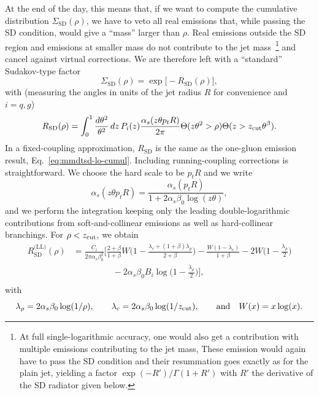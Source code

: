 At the end of the day, this means that, if we want to compute the
cumulative distribution $\Sigma_{\text{SD}}(\rho)$, we have to
veto all real emissions that, while passing the SD condition, would give a ``mass'' larger than $\rho$.
Real emissions outside the SD
region and emissions at smaller mass do not contribute to the jet
mass~\footnote{At full single-logarithmic accuracy, one would also get
  a contribution with multiple emissions contributing to the jet mass,
  These emission would again have to pass the SD condition and
  their resummation goes exactly as for the plain jet, yielding a
  factor $\exp(-R')/\Gamma(1+R')$ with $R'$ the derivative of the
  SD radiator given below.} and cancel against virtual
corrections. We are therefore left with a ``standard'' Sudakov-type
factor
\begin{equation}\label{eq:mMDTSD-ll}
 \Sigma_{\text{SD}}(\rho) = \exp\big[-R_{\text{SD}}(\rho)\big],
\end{equation}
with (measuring the angles in units of the jet radius $R$ for
convenience and $i=q,g$)
\begin{equation}\label{eq:mMDTSD-radiator}
 R_{\text{SD}}(\rho) = \int_0^1
 \frac{d\theta^2}{\theta^2}\,dz\,P_i(z) \frac{\alpha_s(z\theta p_tR)}{2\pi}
 \Theta(z\theta^2>\rho) \Theta(z>z_{\text{cut}} \theta^\beta).
\end{equation}
In a fixed-coupling approximation, $R_{\text{SD}}$ is the same as
the one-gluon emission result, Eq.~\eqref{eq:mmdtsd-lo-cumul}. Including
running-coupling corrections is straightforward. We choose the hard scale to be $p_t R$ and we write
\begin{equation}
\alpha_s(z\theta p_tR) = \frac{\alpha_s (p_tR)}{1+2\alpha_s\beta_0\log(z\theta)},
\end{equation}
and we perform the integration keeping only the leading double-logarithmic contributions from
soft-and-collinear emissions as well as hard-collinear branchings. For $\rho<z_{\text{cut}}$, we obtain
\begin{align}\label{eq:mMDTSD-radiator-modll}
  R_{\text{SD}}^{\text{(LL)}}(\rho)
    & = \frac{C_i}{2\pi\alpha_s\beta_0^2}
      \bigg[\frac{2+\beta}{1+\beta}W\Big(1-\frac{\lambda_c+(1+\beta)\lambda_\rho}{2+\beta}\Big)
      -\frac{W(1-\lambda_c)}{1+\beta}-2W\Big(1-\frac{\lambda_\rho}{2}\Big)\nonumber\\
    & \phantom{=\frac{C_i}{2\pi\alpha_s\beta_0^2} \quad}
      -2\alpha_s\beta_0B_i\log\Big(1-\frac{\lambda_\rho}{2}\Big)\bigg],
\end{align}
with
\[
  \lambda_\rho = 2\alpha_s\beta_0\log(1/\rho),\qquad
  \lambda_c = 2\alpha_s\beta_0\log(1/z_{\text{cut}}),\qquad
  \text{and}\quad
  W(x)=x\log(x).
\]
